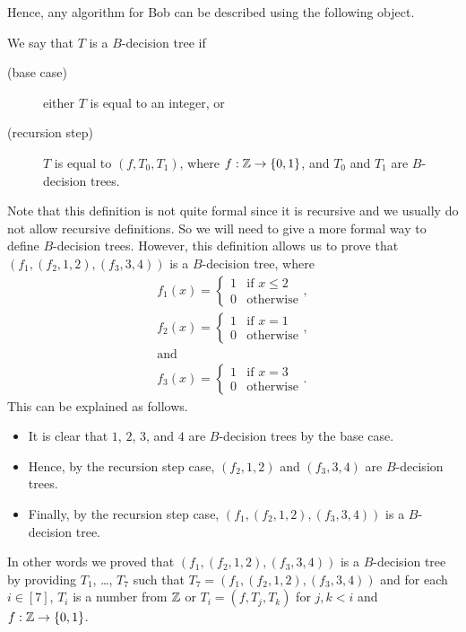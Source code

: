 Hence, any algorithm for Bob can be described using the following object.
\begin{definition}
  We say that $T$ is a $B$-decision tree if
  \begin{description}
    \item [(base case)] either $T$ is equal to an integer, or
    \item [(recursion step)] $T$ is equal to $(f, T_0, T_1)$,
      where $f : \Z \to \set{0, 1}$, and $T_0$ and $T_1$
      are $B$-decision trees.
  \end{description}
\end{definition}
Note that this definition is not quite formal since it is recursive and
we usually do not allow recursive definitions. So we will need to give a more
formal way to define $B$-decision trees. However, this definition allows us to
prove that $(f_1, (f_2, 1, 2), (f_3, 3, 4))$
is a $B$-decision tree, where
\begin{gather*}
  f_1(x) =
    \begin{cases}
      1 & \text{if } x \le 2 \\
      0 & \text{otherwise}
    \end{cases}, \\
  f_2(x) =
    \begin{cases}
      1 & \text{if } x = 1 \\
      0 & \text{otherwise}
    \end{cases}, \\
  \text{and} \\
  f_3(x) =
    \begin{cases}
      1 & \text{if } x = 3 \\
      0 & \text{otherwise}
    \end{cases}.
\end{gather*}
This can be explained as follows.
\begin{itemize}
  \item It is clear that $1$, $2$, $3$, and $4$ are $B$-decision trees by the
    base case.
  \item Hence, by the recursion step case, $(f_2, 1, 2)$ and $(f_3, 3, 4)$
    are $B$-decision trees.
  \item Finally, by the recursion step case, $(f_1, (f_2, 1, 2), (f_3, 3, 4))$
    is a $B$-decision tree.
\end{itemize}
In other words we proved that $(f_1, (f_2, 1, 2), (f_3, 3, 4))$
is a $B$-decision tree by providing $T_1$, \dots, $T_7$ such that
$T_7 = (f_1, (f_2, 1, 2), (f_3, 3, 4))$ and for each $i \in [7]$,
$T_i$ is a number from ${\mathbb{Z}}$ or $T_i = (f, T_j, T_k)$ for $j, k < i$ and
$f : \Z \to \set{0, 1}$.


